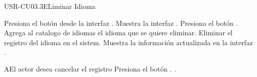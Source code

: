 \begin{UseCase}[]{USR-CU03.3}{ELiminar Idioma}{
}
\end{UseCase}

\begin{UCtrayectoria}
	\UCpaso [\UCactor] Presiona el botón \IUEliminar{} desde la interfaz .
    \UCpaso [\UCsist] Muestra la interfaz .
	\UCpaso [\UCactor] Presiona el botón .
	\UCpaso [\UCsist] Agrega al catalogo de idiomas el idioma que se quiere eliminar.
	\UCpaso [\UCsist] Eliminar el registro del idioma en el sistem.
	\UCpaso [\UCsist] Muestra la información actualizada en la interfaz .
\end{UCtrayectoria}

\begin{UCtrayectoriaA}{A}{El actor desea cancelar el registro}
	\UCpaso [\UCsist] Presiona el botón .
	.
\end{UCtrayectoriaA} 

